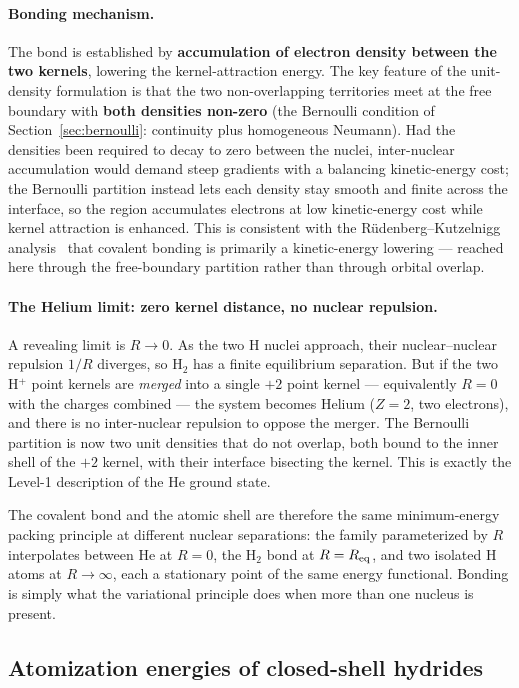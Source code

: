 \documentclass[11pt]{article}
\begin{document}
\paragraph{Bonding mechanism.}
The bond is established by \textbf{accumulation of electron density between the two kernels}, lowering the kernel-attraction energy. The key feature of the unit-density formulation is that the two non-overlapping territories meet at the free boundary with \textbf{both densities non-zero} (the Bernoulli condition of Section~\ref{sec:bernoulli}: continuity plus homogeneous Neumann). Had the densities been required to decay to zero between the nuclei, inter-nuclear accumulation would demand steep gradients with a balancing kinetic-energy cost; the Bernoulli partition instead lets each density stay smooth and finite across the interface, so the region accumulates electrons at low kinetic-energy cost while kernel attraction is enhanced. This is consistent with the R\"udenberg--Kutzelnigg analysis~\cite{Ruedenberg62, Kutzelnigg90} that covalent bonding is primarily a kinetic-energy lowering --- reached here through the free-boundary partition rather than through orbital overlap.

\paragraph{The Helium limit: zero kernel distance, no nuclear repulsion.}
A revealing limit is $R \to 0$. As the two H nuclei approach, their nuclear--nuclear repulsion $1/R$ diverges, so H$_2$ has a finite equilibrium separation. But if the two H$^+$ point kernels are \emph{merged} into a single $+2$ point kernel --- equivalently $R = 0$ with the charges combined --- the system becomes Helium ($Z = 2$, two electrons), and there is no inter-nuclear repulsion to oppose the merger. The Bernoulli partition is now two unit densities that do not overlap, both bound to the inner shell of the $+2$ kernel, with their interface bisecting the kernel. This is exactly the Level-1 description of the He ground state.

The covalent bond and the atomic shell are therefore the same minimum-energy packing principle at different nuclear separations: the family parameterized by $R$ interpolates between He at $R=0$, the H$_2$ bond at $R=R_{\rm eq}$, and two isolated H atoms at $R\to\infty$, each a stationary point of the same energy functional. Bonding is simply what the variational principle does when more than one nucleus is present.

\subsection{Atomization energies of closed-shell hydrides}\label{sec:hydrides}
\end{document}
